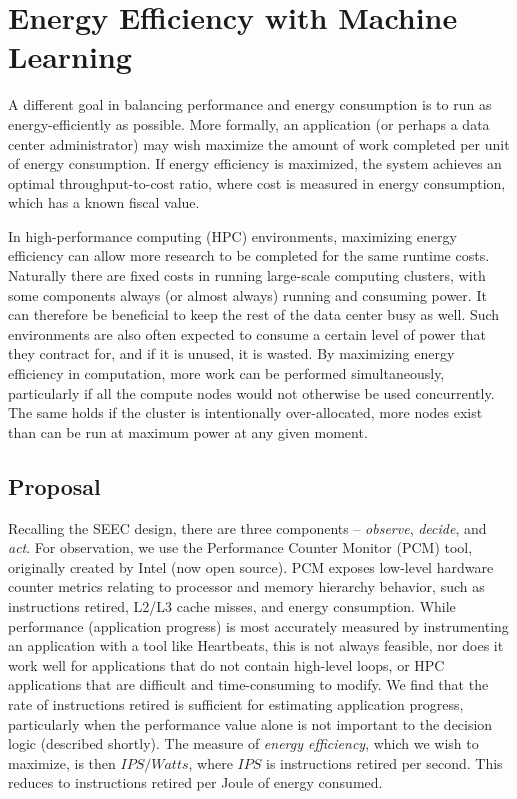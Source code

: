\section{Energy Efficiency with Machine Learning}

A different goal in balancing performance and energy consumption is to run as energy-efficiently as possible.
More formally, an application (or perhaps a data center administrator) may wish maximize the amount of work completed per unit of energy consumption.
If energy efficiency is maximized, the system achieves an optimal throughput-to-cost ratio, where cost is measured in energy consumption, which has a known fiscal value.

In high-performance computing (HPC) environments, maximizing energy efficiency can allow more research to be completed for the same runtime costs.
Naturally there are fixed costs in running large-scale computing clusters, with some components always (or almost always) running and consuming power.
It can therefore be beneficial to keep the rest of the data center busy as well.
Such environments are also often expected to consume a certain level of power that they contract for, and if it is unused, it is wasted.
By maximizing energy efficiency in computation, more work can be performed simultaneously, particularly if all the compute nodes would not otherwise be used concurrently.
The same holds if the cluster is intentionally over-allocated, \ie more nodes exist than can be run at maximum power at any given moment.





\subsection{Proposal}

Recalling the SEEC design, there are three components -- \emph{observe}, \emph{decide}, and \emph{act}.
For observation, we use the Performance Counter Monitor (PCM) tool, originally created by Intel (now open source).
PCM exposes low-level hardware counter metrics relating to processor and memory hierarchy behavior, such as instructions retired, L2/L3 cache misses, and energy consumption.
While performance (\ie application progress) is most accurately measured by instrumenting an application with a tool like Heartbeats, this is not always feasible, nor does it work well for applications that do not contain high-level loops, or HPC applications that are difficult and time-consuming to modify.
We find that the rate of instructions retired is sufficient for estimating application progress, particularly when the performance value alone is not important to the decision logic (described shortly).
The measure of \emph{energy efficiency}, which we wish to maximize, is then $IPS / Watts$, where $IPS$ is instructions retired per second.
This reduces to instructions retired per Joule of energy consumed.

